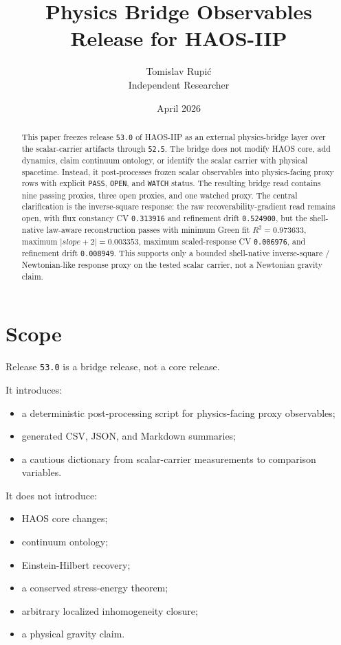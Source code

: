 \documentclass[11pt]{article}
\title{Physics Bridge Observables Release for HAOS-IIP}
\author{Tomislav Rupi\'c \\ Independent Researcher}
\date{April 2026}
\begin{document}
\maketitle

\begin{abstract}
This paper freezes release \texttt{53.0} of HAOS-IIP as an external physics-bridge layer over the scalar-carrier artifacts through \texttt{52.5}. The bridge does not modify HAOS core, add dynamics, claim continuum ontology, or identify the scalar carrier with physical spacetime. Instead, it post-processes frozen scalar observables into physics-facing proxy rows with explicit \texttt{PASS}, \texttt{OPEN}, and \texttt{WATCH} status. The resulting bridge read contains nine passing proxies, three open proxies, and one watched proxy. The central clarification is the inverse-square response: the raw recoverability-gradient read remains open, with flux constancy CV \texttt{0.313916} and refinement drift \texttt{0.524900}, but the shell-native law-aware reconstruction passes with minimum Green fit \(R^2 = 0.973633\), maximum \(|slope+2| = 0.003353\), maximum scaled-response CV \texttt{0.006976}, and refinement drift \texttt{0.008949}. This supports only a bounded shell-native inverse-square / Newtonian-like response proxy on the tested scalar carrier, not a Newtonian gravity claim.
\end{abstract}

\tableofcontents

\section{Scope}

Release \texttt{53.0} is a bridge release, not a core release.

It introduces:
\begin{itemize}
\item a deterministic post-processing script for physics-facing proxy observables;
\item generated CSV, JSON, and Markdown summaries;
\item a cautious dictionary from scalar-carrier measurements to comparison variables.
\end{itemize}

It does not introduce:
\begin{itemize}
\item HAOS core changes;
\item continuum ontology;
\item Einstein-Hilbert recovery;
\item a conserved stress-energy theorem;
\item arbitrary localized inhomogeneity closure;
\item a physical gravity claim.
\end{itemize}
\end{document}
